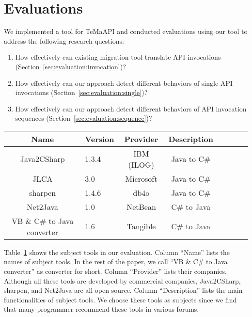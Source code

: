 \section{Evaluations}
\label{sec:evaluation}

We implemented a tool for TeMaAPI and
conducted evaluations using our tool to address the following
research questions:

\begin{enumerate}
\item How effectively can existing migration tool translate API invocations (Section~\ref{sec:evaluation:invocation})? \vspace*{-1.8ex}
\item How effectively can our approach detect different behaviors of single API invocations (Section~\ref{sec:evaluation:single})? \vspace*{-1.8ex}
\item How effectively can our approach detect different behaviors of API invocation sequences (Section~\ref{sec:evaluation:sequence})?
\end{enumerate}%

\begin{table}[t]
\centering
\begin{SmallOut}
\begin {tabular} {|c|l|c|c|c|c|c|c|}
 \hline
\textbf{Name}& \textbf{Version}& \textbf{Provider} &\textbf{Description}\\
\hline
Java2CSharp  &  1.3.4 & IBM (ILOG) & Java to C\# \\
\hline
JLCA         &  3.0   & Microsoft  & Java to C\# \\
\hline
sharpen      &  1.4.6 & db4o       & Java to C\# \\
\hline
Net2Java     &  1.0   & NetBean    &  C\# to Java\\
\hline
VB \& C\# to Java converter    &  1.6   & Tangible   &  C\# to Java\\
\hline
\end{tabular}\vspace*{-2ex}
 \label{table:subjects}
\end{SmallOut}\vspace*{-2ex}
\end{table}

Table~\ref{table:subjects} shows the subject tools in our evaluation. Column ``Name'' lists the names of subject tools. In the rest of the paper, we call ``VB \& C\# to Java converter'' as converter for short. Column ``Provider'' lists their companies. Although all these tools are developed by commercial companies, Java2CSharp, sharpen, and Net2Java are all open source. Column ``Description'' lists the main functionalities of subject tools. We choose these tools as subjects since we find that many programmer recommend these tools in various forums.


